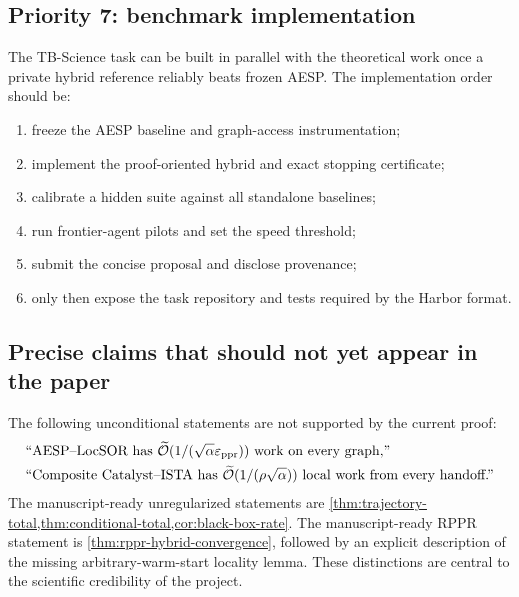 \subsection{Priority 7: benchmark implementation}

The TB-Science task can be built in parallel with the theoretical work once a
private hybrid reference reliably beats frozen AESP.  The implementation order
should be:
\begin{enumerate}[leftmargin=2em]
\item freeze the AESP baseline and graph-access instrumentation;
\item implement the proof-oriented hybrid and exact stopping certificate;
\item calibrate a hidden suite against all standalone baselines;
\item run frontier-agent pilots and set the speed threshold;
\item submit the concise proposal and disclose provenance;
\item only then expose the task repository and tests required by the Harbor
      format.
\end{enumerate}

\subsection{Precise claims that should not yet appear in the paper}

The following unconditional statements are not supported by the current
proof:
\begin{align}
    &\text{``AESP--LocSOR has }
    \widetilde{\mathcal O}(1/(\sqrt\alpha\varepsilon_{\mathrm{ppr}}))
    \text{ work on every graph,''}
    \label{eq:not-yet-claim}\\
    &\text{``Composite Catalyst--ISTA has }
    \widetilde{\mathcal O}(1/(\rho\sqrt\alpha))
    \text{ local work from every handoff.''}
    \label{eq:not-yet-rppr-claim}
\end{align}
The manuscript-ready unregularized statements are
\cref{thm:trajectory-total,thm:conditional-total,cor:black-box-rate}.  The
manuscript-ready RPPR statement is \cref{thm:rppr-hybrid-convergence}, followed
by an explicit description of the missing arbitrary-warm-start locality
lemma.  These distinctions are central to the scientific credibility of the
project.
